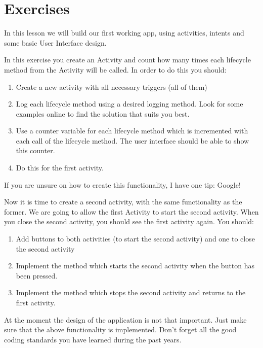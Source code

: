 \newpage
\section{Exercises}
In this lesson we will build our first working app, using activities, intents and some basic User Interface design.

\begin{exercise}
	In this exercise you create an Activity and count how many times each lifecycle method from the Activity will be called.
	In order to do this you should:
	\begin{enumerate}
		\item Create a new activity with all necessary triggers (all of them)
		\item Log each lifecycle method using a desired logging method.
			Look for some examples online to find the solution that suits you best.
		\item Use a counter variable for each lifecycle method which is incremented with each call of the lifecycle method.
			The user interface should be able to show this counter.
		\item Do this for the first activity.
	\end{enumerate}
	\label{ex:act1}
\end{exercise}

If you are unsure on how to create this functionality, I have one tip: Google!

\begin{exercise}
	Now it is time to create a second activity, with the same functionality as the former.
	We are going to allow the first Activity to start the second activity.
	When you close the second activity, you should see the first activity again.
	You should:
	\begin{enumerate}
		\item Add buttons to both activities (to start the second activity) and one to close the second activity
		\item Implement the method which starts the second activity when the button has been pressed.
		\item Implement the method which stops the second activity and returns to the first activity.
	\end{enumerate}
	\label{ex:act2}
\end{exercise}

At the moment the design of the application is not that important.
Just make sure that the above functionality is implemented.
Don't forget all the good coding standards you have learned during the past years.
